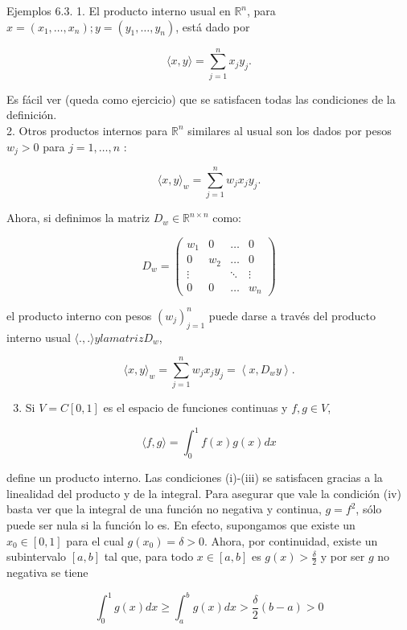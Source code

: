 \documentclass[10pt]{article}
\begin{document}
Ejemplos 6.3. 1. El producto interno usual en $\mathbb{R}^{n}$, para $x=\left(x_{1}, \ldots, x_{n}\right) ; y=\left(y_{1}, \ldots, y_{n}\right)$, está dado por

$$
\langle x, y\rangle=\sum_{j=1}^{n} x_{j} y_{j} .
$$

Es fácil ver (queda como ejercicio) que se satisfacen todas las condiciones de la definición.\\
2. Otros productos internos para $\mathbb{R}^{n}$ similares al usual son los dados por pesos $w_{j}>0$ para $j=1, \ldots, n$ :

$$
\langle x, y\rangle_{w}=\sum_{j=1}^{n} w_{j} x_{j} y_{j} .
$$

Ahora, si definimos la matriz $D_{w} \in \mathbb{R}^{n \times n}$ como:

$$
D_{w}=\left(\begin{array}{cccc}
w_{1} & 0 & \ldots & 0 \\
0 & w_{2} & \ldots & 0 \\
\vdots & & \ddots & \vdots \\
0 & 0 & \ldots & w_{n}
\end{array}\right)
$$

el producto interno con pesos $\left(w_{j}\right)_{j=1}^{n}$ puede darse a través del producto interno usual $\langle.,$.$\rangle y la matriz D_{w}$,

$$
\langle x, y\rangle_{w}=\sum_{j=1}^{n} w_{j} x_{j} y_{j}=\left\langle x, D_{w} y\right\rangle .
$$

\begin{enumerate}
  \setcounter{enumi}{2}
  \item Si $V=C[0,1]$ es el espacio de funciones continuas y $f, g \in V$,
\end{enumerate}

$$
\langle f, g\rangle=\int_{0}^{1} f(x) g(x) d x
$$

define un producto interno. Las condiciones (i)-(iii) se satisfacen gracias a la linealidad del producto y de la integral. Para asegurar que vale la condición (iv) basta ver que la integral de una función no negativa y continua, $g=f^{2}$, sólo puede ser nula si la función lo es. En efecto, supongamos que existe un $x_{0} \in[0,1]$ para el cual $g\left(x_{0}\right)=\delta>0$. Ahora, por continuidad, existe un subintervalo $[a, b]$ tal que, para todo $x \in[a, b]$ es $g(x)>\frac{\delta}{2}$ y por ser $g$ no negativa se tiene

$$
\int_{0}^{1} g(x) d x \geq \int_{a}^{b} g(x) d x>\frac{\delta}{2}(b-a)>0
$$
\end{document}
